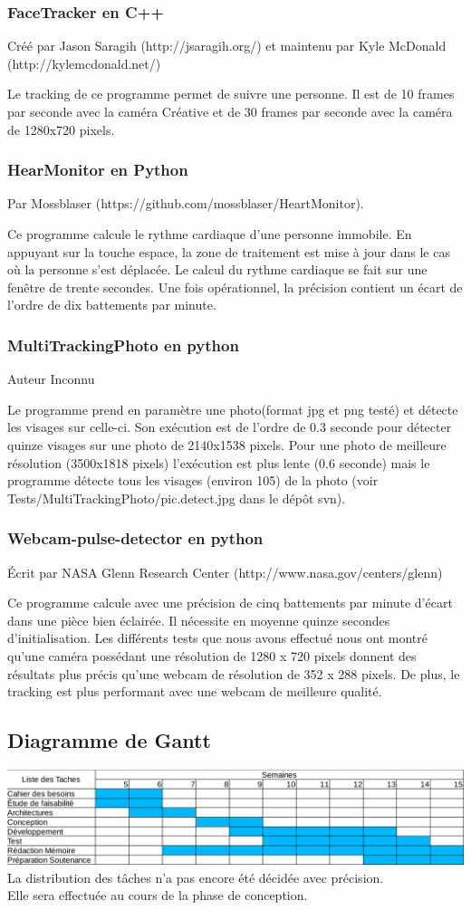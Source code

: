 \documentclass[12pt,a4paper]{article}
\begin{document}
\subsubsection{FaceTracker en C++ }
Créé par Jason Saragih (http://jsaragih.org/) et maintenu par Kyle McDonald (http://kylemcdonald.net/)

Le tracking de ce programme permet de suivre une personne. Il est de 10 frames par seconde avec la caméra Créative et de 30 frames par seconde avec la caméra de 1280x720 pixels.
\newline

\subsubsection{HearMonitor en Python}
Par Mossblaser (https://github.com/mossblaser/HeartMonitor).

Ce programme calcule le rythme cardiaque d'une personne immobile. En appuyant sur la touche espace, la zone de traitement est mise à jour dans le cas où la personne s'est déplacée. Le calcul du rythme cardiaque se fait sur une fenêtre de trente secondes. 
Une fois opérationnel, la précision contient un écart de l'ordre de dix battements par minute.

\subsubsection{MultiTrackingPhoto en python}
Auteur Inconnu 

Le programme prend en paramètre une photo(format jpg et png testé) et détecte les visages sur celle-ci.
Son exécution est de l'ordre de 0.3 seconde pour détecter quinze visages sur une photo de 2140x1538 pixels.
Pour une photo de meilleure résolution (3500x1818 pixels) l'exécution est plus lente (0.6 seconde) mais le programme détecte tous les visages (environ 105) de la photo (voir Tests/MultiTrackingPhoto/pic.detect.jpg dans le dépôt svn).

\subsubsection{Webcam-pulse-detector en python}
Écrit par NASA Glenn Research Center (http://www.nasa.gov/centers/glenn)

Ce programme calcule avec une précision de cinq battements par minute d'écart dans une pièce bien éclairée. Il nécessite en moyenne quinze secondes d'initialisation.
Les différents tests que nous avons effectué nous ont montré qu'une caméra possédant une résolution de 1280 x 720 pixels donnent des résultats plus précis qu'une webcam de résolution de 352 x 288 pixels. 
De plus, le tracking est plus performant avec une webcam de meilleure qualité.
\subsection{Diagramme de Gantt}
\includegraphics[scale=0.40]{Gantt.png}
La distribution des tâches n'a pas encore été décidée avec précision.\\ Elle sera effectuée au cours de la phase de conception.
\end{document}
